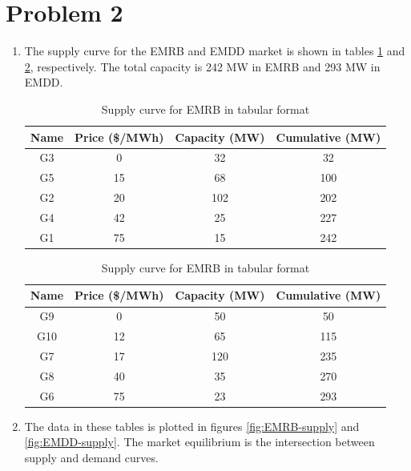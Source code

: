 \documentclass{homework}
\begin{document}
\section{Problem 2}
\begin{enumerate}
    \item The supply curve for the EMRB and EMDD market is shown in tables \ref{tab:EMRB-supply}
    and \ref{tab:EMDD-supply}, respectively. The total capacity is 242 MW in EMRB and 293 MW in EMDD.

    \begin{table}
        \centering
        \begin{tabular}{|c|c|c|c|}
            \hline
            Name & Price (\$/MWh) & Capacity (MW) & Cumulative (MW) \\
            \hline
            G3  &    0 &     32  &         32 \\
            G5  &   15 &     68  &        100 \\
            G2  &   20 &    102  &        202 \\
            G4  &   42 &     25  &        227 \\
            G1  &   75 &     15  &        242 \\
            \hline
        \end{tabular}
        \caption{Supply curve for EMRB in tabular format}
        \label{tab:EMRB-supply}
    \end{table}

    \begin{table}
        \centering
        \begin{tabular}{|c|c|c|c|}
            \hline
            Name & Price (\$/MWh) & Capacity (MW) & Cumulative (MW) \\
            \hline
            G9  &   0  &    50        &      50 \\
            G10 &  12  &    65        &     115 \\
            G7  &  17  &   120        &     235 \\
            G8  &  40  &    35        &     270 \\
            G6  &  75  &    23        &     293 \\
            \hline
        \end{tabular}
        \caption{Supply curve for EMRB in tabular format}
        \label{tab:EMDD-supply}
    \end{table}


    \item The data in these tables is plotted in figures \ref{fig:EMRB-supply}
    and \ref{fig:EMDD-supply}.     
    The market equilibrium is the intersection between supply and demand
    curves. 
    

\end{enumerate}
\end{document}
